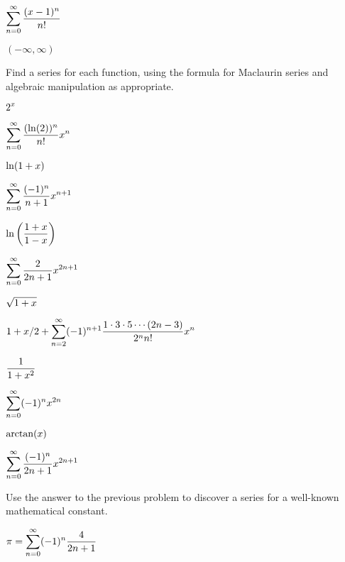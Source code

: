 \begin{exercises}
\begin{exercise} $\displaystyle\sum_{n=0}^\infty {(x-1)^n\over n!}$
\begin{answer} $(-\infty,\infty)$
\end{answer}\end{exercise}

\msk\noindent
Find a series for each function, using the formula for Maclaurin
series and algebraic manipulation as appropriate.

\begin{exercise} $\displaystyle 2^x$
\begin{answer} $\displaystyle\sum_{n=0}^\infty {(\ln(2))^n\over n!}x^n$
\end{answer}\end{exercise}

\begin{exercise} $\displaystyle \ln(1+x)$
\begin{answer} $\displaystyle\sum_{n=0}^\infty {(-1)^n\over n+1}x^{n+1}$
\end{answer}\end{exercise}

\begin{exercise} $\displaystyle \ln\left({1+x\over 1-x}\right)$
\begin{answer} $\displaystyle \sum_{n=0}^\infty {2\over 2n+1}x^{2n+1}$
\end{answer}\end{exercise}

\begin{exercise} $\displaystyle \sqrt{1+x}$
\begin{answer} $\displaystyle 1+ x/2+\sum_{n=2}^\infty (-1)^{n+1}
{1\cdot3\cdot5\cdots(2n-3)\over2^n n!}x^n$
\end{answer}\end{exercise}

\begin{exercise} $\displaystyle {1\over 1+x^2}$
\begin{answer} $\displaystyle \sum_{n=0}^\infty (-1)^n x^{2n}$
\end{answer}\end{exercise}

\begin{exercise} $\displaystyle \arctan(x)$
\begin{answer} $\displaystyle \sum_{n=0}^\infty {(-1)^n\over 2n+1} x^{2n+1}$
\end{answer}\end{exercise}

\begin{exercise} Use the answer to the previous problem to discover a series
for a well-known mathematical constant.
\begin{answer} $\pi = \displaystyle \sum_{n=0}^\infty (-1)^n{4\over 2n+1}$
\end{answer}\end{exercise}

\end{exercises}
